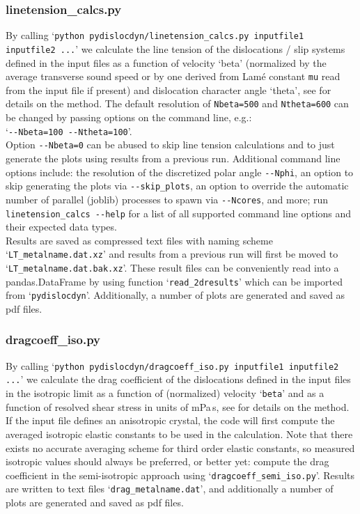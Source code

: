 \documentclass[11pt,letterpaper,oneside]{article}
\begin{document}
\subsubsection{linetension\_calcs.py}

By calling `\verb|python pydislocdyn/linetension_calcs.py inputfile1 inputfile2 ...|' we calculate the line tension of the dislocations / slip systems defined in the input files as a function of velocity `beta' (normalized by the average transverse sound speed or by one derived from Lam\'e constant \verb|mu| read from the input file if present) and dislocation character angle `theta', see \cite{Blaschke:2017lten} for details on the method.
The default resolution of \verb|Nbeta=500| and \verb|Ntheta=600| can be changed by passing options on the command line, e.g.:
\\`\verb|--Nbeta=100 --Ntheta=100|'.\\
Option \verb|--Nbeta=0| can be abused to skip line tension calculations and to just generate the plots using results from a previous run. 
Additional command line options include:
the resolution of the discretized polar angle \verb|--Nphi|,
an option to skip generating the plots via \verb|--skip_plots|,
an option to override the automatic number of parallel (joblib) processes to spawn via \verb|--Ncores|,
and more; run \verb|linetension_calcs --help| for a list of all supported command line options and their expected data types.
\\
Results are saved as compressed text files with naming scheme `\verb|LT_metalname.dat.xz|' and results from a previous run will first be moved to `\verb|LT_metalname.dat.bak.xz|'.
These result files can be conveniently read into a pandas.DataFrame by using function `\verb|read_2dresults|' which can be imported from `\verb|pydislocdyn|'.
Additionally, a number of plots are generated and saved as pdf files.



\subsubsection{dragcoeff\_iso.py}

By calling `\verb|python pydislocdyn/dragcoeff_iso.py inputfile1 inputfile2 ...|' we calculate the drag coefficient of the dislocations defined in the input files in the isotropic limit as a function of (normalized) velocity `\verb|beta|' and as a function of resolved shear stress in units of mPa\,s, see \cite{Blaschke:BpaperRpt,Blaschke:2019Bpap,Blaschke:2019a} for details on the method.
If the input file defines an anisotropic crystal, the code will first compute the averaged isotropic elastic constants to be used in the calculation.
Note that there exists no accurate averaging scheme for third order elastic constants, so measured isotropic values should always be preferred, or better yet: compute the drag coefficient in the semi-isotropic approach using  `\verb|dragcoeff_semi_iso.py|'.
Results are written to text files `\verb|drag_metalname.dat|', and additionally a number of plots are generated and saved as pdf files.
\end{document}
